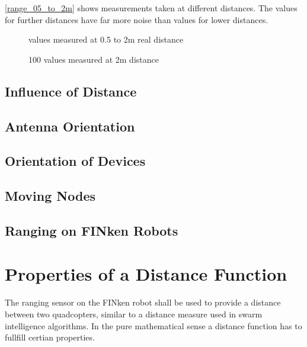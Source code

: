 \autoref{range_05_to_2m} shows measurements taken at different distances.
The values for further distances have far more noise than values for lower distances. 


\begin{figure}[H]
	\centering
	
	\caption{values measured at 0.5 to 2m real distance}
	\label{range_05_to_2m}
\end{figure}

\begin{figure}[H]
	\centering
	
	\caption{100 values measured at 2m distance}
	\label{2m}
\end{figure}

\subsection{Influence of Distance}


\subsection{Antenna Orientation}



\subsection{Orientation of Devices}


\subsection{Moving Nodes}

\subsection{Ranging on FINken Robots}

\section{Properties of a Distance Function}
The ranging sensor on the FINken robot shall be used to provide a distance between two quadcopters, similar to a distance measure used in swarm intelligence algorithms.
In the pure mathematical sense a distance function has to fullfill certian properties.

